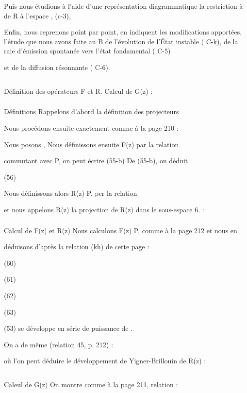 Puis nous étudions à l'aide d'une représentation diagrammatique
la restriction à de R à l'espace , (c-3),

Enfin, nous reprenons point par point, en indiquent les modifications apportées, l'étude que nous avons faite au  B de l'évolution de l'État instable ( C-k), de la raie d'émission spontanée vers l'état fondamental ( C-5)

et de la diffusion résonnante ( C-6).


\subsection{} Définition des opérateurs F et R. Calcul de G(z) :%
\subsubsection{} Définitions Rappelons d'abord la définition des projecteurs%

Nous procédons ensuite exactement comme à la page 210 :

Nous posons
,
Nous définissons ensuite F(z) par la relation

commutant avec P, on peut écrire
(55-b)
De (55-b), on déduit

(56)

Nous définissons alors R(z) P, per la relation

et nous appelons R(z) la projection de R(z) dans le sous-espace 6. :

\subsubsection{} Calcul de F(z) et R(z)%
Nous calculons F(z) P, comme à la page 212 et nous en

déduisons d'après la relation (kh) de cette page :

(60)

(61)

(62)

(63)


(53) se développe en série de puissance de .

On a de même (relation 45, p. 212) :

où l'on peut déduire le développement de Yigner-Brillouin de R(z) :

\subsection{} Caleul de G(z)%
On montre comme à la page 211, relation :


